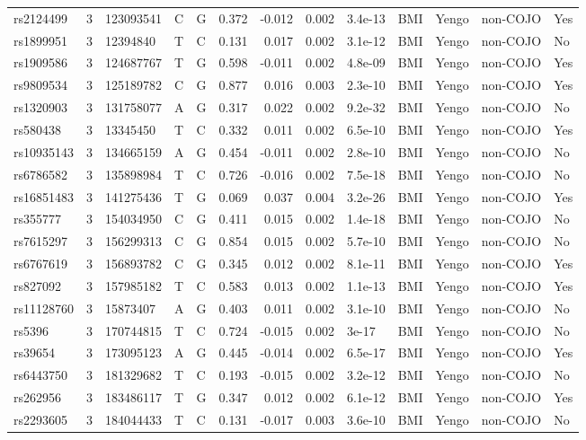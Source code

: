 \documentclass[11pt,twoside]{bristolthesis}
\begin{document}
\begin{longtable}[t]{lrlllrrrlllll}
rs2124499 & 3 & 123093541 & C & G & 0.372 & -0.012 & 0.002 & 3.4e-13 & BMI & Yengo & non-COJO & Yes\\
rs1899951 & 3 & 12394840 & T & C & 0.131 & 0.017 & 0.002 & 3.1e-12 & BMI & Yengo & non-COJO & No\\
rs1909586 & 3 & 124687767 & T & G & 0.598 & -0.011 & 0.002 & 4.8e-09 & BMI & Yengo & non-COJO & Yes\\
rs9809534 & 3 & 125189782 & C & G & 0.877 & 0.016 & 0.003 & 2.3e-10 & BMI & Yengo & non-COJO & Yes\\
\addlinespace
rs1320903 & 3 & 131758077 & A & G & 0.317 & 0.022 & 0.002 & 9.2e-32 & BMI & Yengo & non-COJO & No\\
rs580438 & 3 & 13345450 & T & C & 0.332 & 0.011 & 0.002 & 6.5e-10 & BMI & Yengo & non-COJO & Yes\\
rs10935143 & 3 & 134665159 & A & G & 0.454 & -0.011 & 0.002 & 2.8e-10 & BMI & Yengo & non-COJO & No\\
rs6786582 & 3 & 135898984 & T & C & 0.726 & -0.016 & 0.002 & 7.5e-18 & BMI & Yengo & non-COJO & No\\
rs16851483 & 3 & 141275436 & T & G & 0.069 & 0.037 & 0.004 & 3.2e-26 & BMI & Yengo & non-COJO & Yes\\
\addlinespace
rs355777 & 3 & 154034950 & C & G & 0.411 & 0.015 & 0.002 & 1.4e-18 & BMI & Yengo & non-COJO & No\\
rs7615297 & 3 & 156299313 & C & G & 0.854 & 0.015 & 0.002 & 5.7e-10 & BMI & Yengo & non-COJO & No\\
rs6767619 & 3 & 156893782 & C & G & 0.345 & 0.012 & 0.002 & 8.1e-11 & BMI & Yengo & non-COJO & Yes\\
rs827092 & 3 & 157985182 & T & C & 0.583 & 0.013 & 0.002 & 1.1e-13 & BMI & Yengo & non-COJO & Yes\\
rs11128760 & 3 & 15873407 & A & G & 0.403 & 0.011 & 0.002 & 3.1e-10 & BMI & Yengo & non-COJO & No\\
\addlinespace
rs5396 & 3 & 170744815 & T & C & 0.724 & -0.015 & 0.002 & 3e-17 & BMI & Yengo & non-COJO & No\\
rs39654 & 3 & 173095123 & A & G & 0.445 & -0.014 & 0.002 & 6.5e-17 & BMI & Yengo & non-COJO & Yes\\
rs6443750 & 3 & 181329682 & T & C & 0.193 & -0.015 & 0.002 & 3.2e-12 & BMI & Yengo & non-COJO & No\\
rs262956 & 3 & 183486117 & T & G & 0.347 & 0.012 & 0.002 & 6.1e-12 & BMI & Yengo & non-COJO & Yes\\
rs2293605 & 3 & 184044433 & T & C & 0.131 & -0.017 & 0.003 & 3.6e-10 & BMI & Yengo & non-COJO & No\\

\end{longtable}
\end{document}
